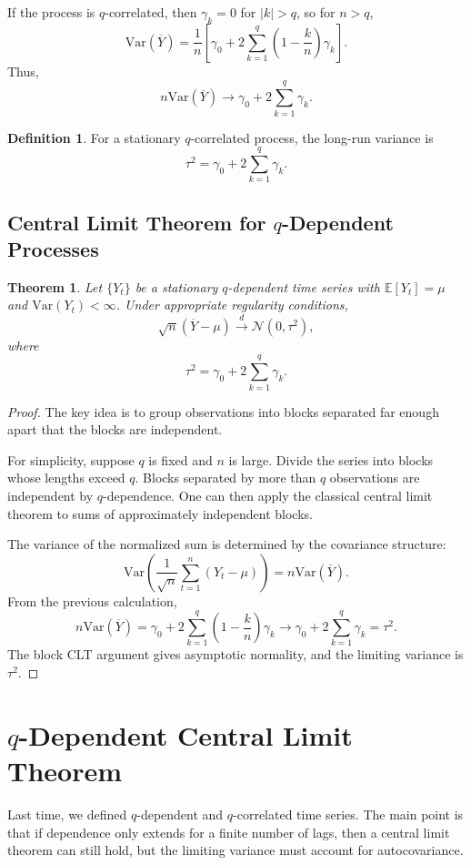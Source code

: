 \documentclass[12pt,oneside]{book}
\numberwithin{equation}{section}
\theoremstyle{definition}
\newtheorem{definition}{Definition}[section]
\theoremstyle{plain}
\newtheorem{theorem}{Theorem}[section]
\theoremstyle{remark}
\newcommand{\E}{\mathbb{E}}
\newcommand{\Var}{\mathrm{Var}}
\newcommand{\convd}{\overset{d}{\to}}
\newcommand{\Normal}{\mathcal{N}}
\begin{document}
If the process is $q$-correlated, then $\gamma_k=0$ for $|k|>q$, so for $n>q$,
\[
\Var(\overline{Y})
=
\frac{1}{n}
\left[
\gamma_0
+
2\sum_{k=1}^{q}
\left(1-\frac{k}{n}\right)\gamma_k
\right].
\]
Thus,
\[
n\Var(\overline{Y})
\to
\gamma_0+2\sum_{k=1}^q \gamma_k.
\]

\begin{definition}
For a stationary $q$-correlated process, the long-run variance is
\[
\tau^2
=
\gamma_0+2\sum_{k=1}^q \gamma_k.
\]
\end{definition}

\subsection*{Central Limit Theorem for $q$-Dependent Processes}

\begin{theorem}
Let $\{Y_t\}$ be a stationary $q$-dependent time series with $\E[Y_t]=\mu$ and $\Var(Y_t)<\infty$. Under appropriate regularity conditions,
\[
\sqrt{n}(\overline{Y}-\mu)
\convd
\Normal(0,\tau^2),
\]
where
\[
\tau^2
=
\gamma_0+2\sum_{k=1}^q \gamma_k.
\]
\end{theorem}

\begin{proof}
The key idea is to group observations into blocks separated far enough apart that the blocks are independent.

For simplicity, suppose $q$ is fixed and $n$ is large. Divide the series into blocks whose lengths exceed $q$. Blocks separated by more than $q$ observations are independent by $q$-dependence. One can then apply the classical central limit theorem to sums of approximately independent blocks.

The variance of the normalized sum is determined by the covariance structure:
\[
\Var\left(\frac{1}{\sqrt{n}}\sum_{t=1}^n (Y_t-\mu)\right)
=
n\Var(\overline{Y}).
\]
From the previous calculation,
\[
n\Var(\overline{Y})
=
\gamma_0
+
2\sum_{k=1}^{q}
\left(1-\frac{k}{n}\right)\gamma_k
\to
\gamma_0+2\sum_{k=1}^q\gamma_k
=
\tau^2.
\]
The block CLT argument gives asymptotic normality, and the limiting variance is $\tau^2$.
\end{proof}

\section{$q$-Dependent Central Limit Theorem}

Last time, we defined $q$-dependent and $q$-correlated time series. The main point is that if dependence only extends for a finite number of lags, then a central limit theorem can still hold, but the limiting variance must account for autocovariance.
\end{document}
